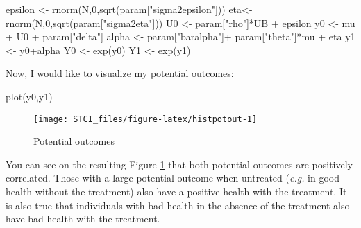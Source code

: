 \documentclass[
]{book}
\newenvironment{Shaded}{\begin{snugshade}}{\end{snugshade}}
\newcommand{\DecValTok}[1]{\textcolor[rgb]{0.00,0.00,0.81}{#1}}
\newcommand{\FunctionTok}[1]{\textcolor[rgb]{0.00,0.00,0.00}{#1}}
\newcommand{\NormalTok}[1]{#1}
\newcommand{\OtherTok}[1]{\textcolor[rgb]{0.56,0.35,0.01}{#1}}
\newcommand{\SpecialCharTok}[1]{\textcolor[rgb]{0.00,0.00,0.00}{#1}}
\newcommand{\StringTok}[1]{\textcolor[rgb]{0.31,0.60,0.02}{#1}}
\theoremstyle{definition}
\theoremstyle{definition}
\theoremstyle{definition}
\theoremstyle{definition}
\theoremstyle{remark}
\begin{document}
\begin{Shaded}
\begin{Highlighting}[]
\NormalTok{epsilon }\OtherTok{\textless{}{-}} \FunctionTok{rnorm}\NormalTok{(N,}\DecValTok{0}\NormalTok{,}\FunctionTok{sqrt}\NormalTok{(param[}\StringTok{"sigma2epsilon"}\NormalTok{]))}
\NormalTok{eta}\OtherTok{\textless{}{-}} \FunctionTok{rnorm}\NormalTok{(N,}\DecValTok{0}\NormalTok{,}\FunctionTok{sqrt}\NormalTok{(param[}\StringTok{"sigma2eta"}\NormalTok{]))}
\NormalTok{U0 }\OtherTok{\textless{}{-}}\NormalTok{ param[}\StringTok{"rho"}\NormalTok{]}\SpecialCharTok{*}\NormalTok{UB }\SpecialCharTok{+}\NormalTok{ epsilon}
\NormalTok{y0 }\OtherTok{\textless{}{-}}\NormalTok{ mu }\SpecialCharTok{+}\NormalTok{  U0 }\SpecialCharTok{+}\NormalTok{ param[}\StringTok{"delta"}\NormalTok{]}
\NormalTok{alpha }\OtherTok{\textless{}{-}}\NormalTok{ param[}\StringTok{"baralpha"}\NormalTok{]}\SpecialCharTok{+}\NormalTok{  param[}\StringTok{"theta"}\NormalTok{]}\SpecialCharTok{*}\NormalTok{mu }\SpecialCharTok{+}\NormalTok{ eta}
\NormalTok{y1 }\OtherTok{\textless{}{-}}\NormalTok{ y0}\SpecialCharTok{+}\NormalTok{alpha}
\NormalTok{Y0 }\OtherTok{\textless{}{-}} \FunctionTok{exp}\NormalTok{(y0)}
\NormalTok{Y1 }\OtherTok{\textless{}{-}} \FunctionTok{exp}\NormalTok{(y1)}
\end{Highlighting}
\end{Shaded}

Now, I would like to visualize my potential outcomes:

\begin{Shaded}
\begin{Highlighting}[]
\FunctionTok{plot}\NormalTok{(y0,y1)}
\end{Highlighting}
\end{Shaded}

\begin{figure}

{\centering \texttt{[image: STCI\_files/figure-latex/histpotout-1]} 

}

\caption{Potential outcomes}\label{fig:histpotout}
\end{figure}

You can see on the resulting Figure \ref{fig:histpotout} that both potential outcomes are positively correlated.
Those with a large potential outcome when untreated (\emph{e.g.} in good health without the treatment) also have a positive health with the treatment.
It is also true that individuals with bad health in the absence of the treatment also have bad health with the treatment.
\end{document}

